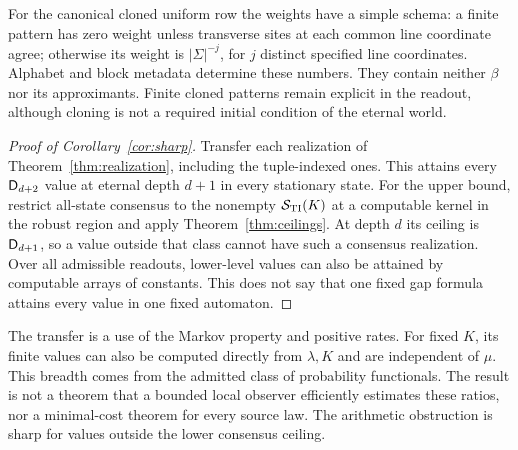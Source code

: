 For the canonical cloned uniform row the weights have a simple
schema: a finite pattern has zero weight unless transverse sites
at each common line coordinate agree; otherwise its weight is
$|\Sigma|^{-j}$, for $j$ distinct specified line coordinates.
Alphabet and block metadata determine these numbers. They contain
neither $\beta$ nor its approximants. Finite cloned patterns
remain explicit in the readout, although cloning is not a required
initial condition of the eternal world.

\begin{proof}[Proof of Corollary~\ref{cor:sharp}]
Transfer each realization of Theorem~\ref{thm:realization},
including the tuple-indexed ones. This attains every $\mathsf D_{d+2}$
value at eternal depth $d+1$ in every stationary state. For the
upper bound, restrict all-state consensus to the nonempty
$\mathcal S_{\rm TI}(K)$ at a computable kernel in the robust region and apply
Theorem~\ref{thm:ceilings}. At depth $d$ its ceiling is
$\mathsf D_{d+1}$, so a value outside that class cannot have such a
consensus realization. Over all admissible readouts, lower-level
values can also be attained by computable arrays of constants.
This does not say that one fixed gap formula attains every value
in one fixed automaton.
\end{proof}

The transfer is a use of the Markov property and positive rates.
For fixed $K$, its finite values can also be computed directly
from $\lambda,K$ and are independent of $\mu$. This breadth
comes from the admitted class of probability functionals.
The result is not a theorem that a bounded local observer
efficiently estimates these ratios, nor a minimal-cost theorem
for every source law. The arithmetic obstruction is sharp for
values outside the lower consensus ceiling.
